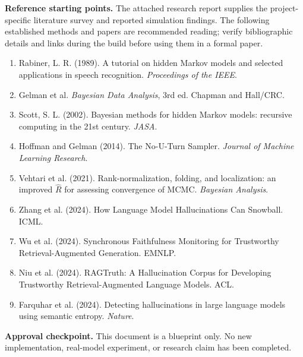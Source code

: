 \documentclass[11pt,letterpaper]{article}
\begin{document}
\textbf{Reference starting points.} The attached research report supplies the project-specific literature survey and reported simulation findings. The following established methods and papers are recommended reading; verify bibliographic details and links during the build before using them in a formal paper.
\begin{enumerate}[leftmargin=*]
\item Rabiner, L. R. (1989). A tutorial on hidden Markov models and selected applications in speech recognition. \emph{Proceedings of the IEEE}.
\item Gelman et al. \emph{Bayesian Data Analysis}, 3rd ed. Chapman and Hall/CRC.
\item Scott, S. L. (2002). Bayesian methods for hidden Markov models: recursive computing in the 21st century. \emph{JASA}.
\item Hoffman and Gelman (2014). The No-U-Turn Sampler. \emph{Journal of Machine Learning Research}.
\item Vehtari et al. (2021). Rank-normalization, folding, and localization: an improved $\widehat R$ for assessing convergence of MCMC. \emph{Bayesian Analysis}.
\item Zhang et al. (2024). How Language Model Hallucinations Can Snowball. ICML.
\item Wu et al. (2024). Synchronous Faithfulness Monitoring for Trustworthy Retrieval-Augmented Generation. EMNLP.
\item Niu et al. (2024). RAGTruth: A Hallucination Corpus for Developing Trustworthy Retrieval-Augmented Language Models. ACL.
\item Farquhar et al. (2024). Detecting hallucinations in large language models using semantic entropy. \emph{Nature}.
\end{enumerate}
\textbf{Approval checkpoint.} This document is a blueprint only. No new implementation, real-model experiment, or research claim has been completed.
\end{document}
